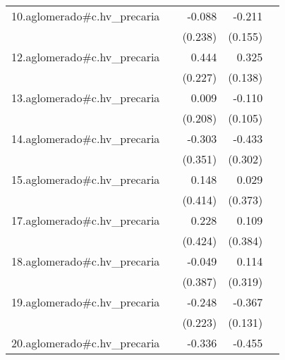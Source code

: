 {\begin{longtable}{l*{4}{D{.}{.}{-1}}}
\addlinespace
10.aglomerado#c.hv\_precaria&                     &      -0.088         &      -0.211         &                     \\
            &                     &     (0.238)         &     (0.155)         &                     \\
\addlinespace
12.aglomerado#c.hv\_precaria&                     &       0.444         &       0.325\sym{*}  &                     \\
            &                     &     (0.227)         &     (0.138)         &                     \\
\addlinespace
13.aglomerado#c.hv\_precaria&                     &       0.009         &      -0.110         &                     \\
            &                     &     (0.208)         &     (0.105)         &                     \\
\addlinespace
14.aglomerado#c.hv\_precaria&                     &      -0.303         &      -0.433         &                     \\
            &                     &     (0.351)         &     (0.302)         &                     \\
\addlinespace
15.aglomerado#c.hv\_precaria&                     &       0.148         &       0.029         &                     \\
            &                     &     (0.414)         &     (0.373)         &                     \\
\addlinespace
17.aglomerado#c.hv\_precaria&                     &       0.228         &       0.109         &                     \\
            &                     &     (0.424)         &     (0.384)         &                     \\
\addlinespace
18.aglomerado#c.hv\_precaria&                     &      -0.049         &       0.114         &                     \\
            &                     &     (0.387)         &     (0.319)         &                     \\
\addlinespace
19.aglomerado#c.hv\_precaria&                     &      -0.248         &      -0.367\sym{**} &                     \\
            &                     &     (0.223)         &     (0.131)         &                     \\
\addlinespace
20.aglomerado#c.hv\_precaria&                     &      -0.336         &      -0.455         &                     \\

\end{longtable}}
